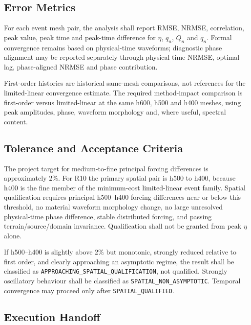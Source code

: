 
\subsection{Error Metrics}
\label{sec:res-ver-cnv-error-metrics}

For each event mesh pair, the analysis shall report RMSE, NRMSE,
correlation, peak value, peak time and peak-time difference for
$\eta$, $q_n$, $Q_n$ and $\bar{q}_n$. Formal convergence remains based
on physical-time waveforms; diagnostic phase alignment may be reported
separately through physical-time NRMSE, optimal lag, phase-aligned NRMSE
and phase contribution.

First-order histories are historical same-mesh comparisons, not
references for the limited-linear convergence estimate. The required
method-impact comparison is first-order versus limited-linear at the
same h600, h500 and h400 meshes, using peak amplitudes, phase,
waveform morphology and, where useful, spectral content.

\subsection{Tolerance and Acceptance Criteria}
\label{sec:res-ver-cnv-tolerance-acceptance-criteria}

The project target for medium-to-fine principal forcing differences is
approximately $2\%$. For R10 the primary spatial pair is h500 to h400,
because h400 is the fine member of the minimum-cost limited-linear
event family. Spatial qualification requires principal h500--h400
forcing differences near or below this threshold, no material waveform
morphology change, no large unresolved physical-time phase difference,
stable distributed forcing, and passing terrain/source/domain
invariance. Qualification shall not be granted from peak $\eta$ alone.

If h500--h400 is slightly above $2\%$ but monotonic, strongly reduced
relative to first order, and clearly approaching an asymptotic regime,
the result shall be classified as
\texttt{APPROACHING\_SPATIAL\_QUALIFICATION}, not qualified. Strongly
oscillatory behaviour shall be classified as
\texttt{SPATIAL\_NON\_ASYMPTOTIC}. Temporal convergence may proceed
only after \texttt{SPATIAL\_QUALIFIED}.

\subsection{Execution Handoff}
\label{sec:res-ver-cnv-execution-handoff}

